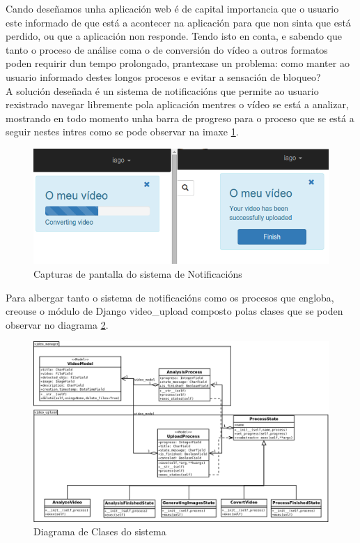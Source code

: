 		Cando deseñamos unha aplicación web é de capital importancia que o usuario este informado de que está
		a acontecer na aplicación para que non sinta que está perdido, ou que a aplicación non responde. Tendo
		isto en conta, e sabendo que tanto o proceso de análise coma o de conversión do vídeo a outros 
		formatos poden requirir dun tempo prolongado, prantexase un problema: como manter ao usuario informado
		destes longos procesos e evitar a sensación de bloqueo?\\
		
		A solución deseñada é un sistema de notificacións que permite ao usuario rexistrado navegar libremente
		pola aplicación mentres o vídeo se está a analizar, mostrando en todo momento unha barra de progreso
		para o proceso que se está a seguir nestes intres como se pode observar na imaxe 
		\ref{fig:Notificacions}.
		
		\begin{figure}[htp]
		\begin{center}
			\includegraphics[scale=0.5]{figures/Notificacions.png}
			\caption{Capturas de pantalla do sistema de Notificacións}
		\label{fig:Notificacions}
		\end{center}
		\end{figure}
		
		Para albergar tanto o sistema de notificacións como os procesos que engloba, creouse o módulo de 
		Django video\_upload composto polas clases que se poden observar no diagrama \ref{fig:ClassDiagram}.

		\begin{figure}[htp]
		\begin{center}
			\includegraphics[scale=0.25]{figures/ClassDiagram.png}
			\caption{Diagrama de Clases do sistema}
		\label{fig:ClassDiagram}
		\end{center}
		\end{figure}
		
